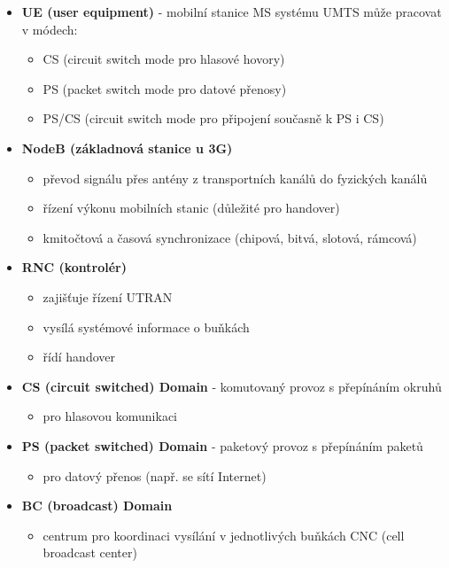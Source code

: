 \begin{itemize}
	\item \textbf{UE (user equipment)} - mobilní stanice MS systému UMTS může pracovat v módech:
	\begin{itemize}	
		\item CS (circuit switch mode pro hlasové hovory)
		\item PS (packet switch mode pro datové přenosy)
		\item PS/CS (circuit switch mode pro připojení současně k PS i CS)
	\end{itemize}
	\item \textbf{NodeB (základnová stanice u 3G)}
	\begin{itemize}	
		\item převod signálu přes antény z transportních kanálů do fyzických kanálů
		\item řízení výkonu mobilních stanic (důležité pro handover)
		\item kmitočtová a časová synchronizace (chipová, bitvá, slotová, rámcová)
	\end{itemize}
	\item \textbf{RNC (kontrolér)}
	\begin{itemize}	
		\item zajišťuje řízení UTRAN
		\item vysílá systémové informace o buňkách
		\item řídí handover 
	\end{itemize}
	\item \textbf{CS (circuit switched) Domain} - komutovaný provoz s přepínáním okruhů
	\begin{itemize}	
		\item pro hlasovou komunikaci
	\end{itemize}
	\item \textbf{PS (packet switched) Domain} - paketový provoz s přepínáním paketů
	\begin{itemize}	
		\item pro datový přenos (např. se sítí Internet)
	\end{itemize}
	\item \textbf{BC (broadcast) Domain}
	\begin{itemize}	
		\item centrum pro koordinaci vysílání v jednotlivých buňkách CNC (cell broadcast center)
	\end{itemize}
\end{itemize}

